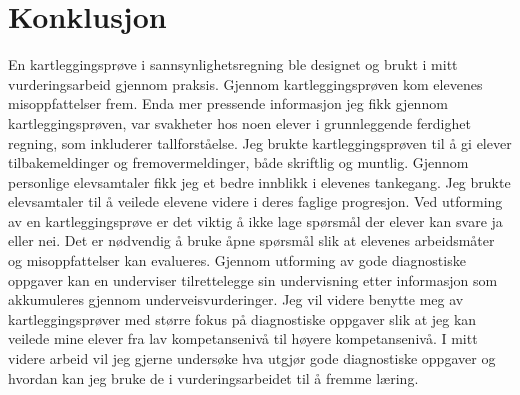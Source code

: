 \documentclass[main.tex]{subfiles}
\begin{document}
\section*{Konklusjon}

En kartleggingsprøve i sannsynlighetsregning ble designet og brukt i mitt vurderingsarbeid
gjennom praksis. Gjennom kartleggingsprøven kom elevenes misoppfattelser frem. Enda mer pressende 
informasjon jeg fikk gjennom kartleggingsprøven, var svakheter hos noen elever i grunnleggende 
ferdighet regning, som inkluderer tallforståelse. Jeg brukte kartleggingsprøven til å gi elever tilbakemeldinger 
og fremovermeldinger, både skriftlig og muntlig. Gjennom personlige elevsamtaler fikk jeg et bedre 
innblikk i elevenes tankegang. Jeg brukte elevsamtaler til å veilede elevene videre i deres faglige progresjon. 
Ved utforming av en kartleggingsprøve er det viktig å ikke lage spørsmål der elever kan svare ja eller nei. 
Det er nødvendig å bruke åpne spørsmål slik at elevenes arbeidsmåter og misoppfattelser kan evalueres. 
Gjennom utforming av gode diagnostiske oppgaver kan en underviser tilrettelegge sin undervisning etter 
informasjon som akkumuleres gjennom underveisvurderinger. Jeg vil videre benytte meg av kartleggingsprøver 
med større fokus på diagnostiske oppgaver slik at jeg kan veilede mine elever fra lav 
kompetansenivå til høyere kompetansenivå. I mitt videre arbeid vil jeg gjerne undersøke hva 
utgjør gode diagnostiske oppgaver og hvordan kan jeg bruke de i vurderingsarbeidet til å fremme 
læring.
\end{document}
